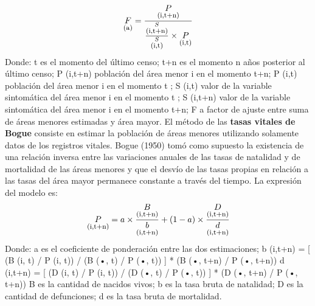 \documentclass{article}
\theoremstyle{mytheoremstyle}
\theoremstyle{mytheoremstyle}
\theoremstyle{myproblemstyle}
\begin{document}
\begin{equation}
  \underset{\textstyle \text{\footnotesize(a)}}{F}=\frac{\underset{\textstyle \text{\footnotesize(i,t+n)}}{P}}
  {\frac{\underset{\textstyle\text{\footnotesize(i,t+n)}}{S}}{\underset{\textstyle\text{\footnotesize(i,t)}}{S}}
  \times
   \underset{\textstyle \text{\footnotesize(i,t)}}{P} }
\end{equation}
\newline
Donde:\newline
t es el momento del último censo;\newline
t+n es el momento n años posterior al último censo;\newline
P (i,t+n) población del área menor i en el momento t+n;\newline
P (i,t) población del área menor i en el momento t ;\newline
S (i,t) valor de la variable sintomática del área menor i en el momento t ;\newline
S (i,t+n) valor de la variable sintomática del área menor i en el momento t+n;\newline
F a factor de ajuste entre suma de áreas menores estimadas y área mayor.\newline
\newline
El método de las \textbf{tasas vitales de Bogue} consiste en estimar la población de áreas menores
utilizando solamente datos de los registros vitales. Bogue (1950) tomó como supuesto la
existencia de una relación inversa entre las variaciones anuales de las tasas de natalidad y de
mortalidad de las áreas menores y que el desvío de las tasas propias en relación a las tasas del área
mayor permanece constante a través del tiempo. La expresión del modelo es:
\newline
\begin{equation}
  \underset{\textstyle \text{\footnotesize(i,t+n)}}{P}=a \times \frac{\underset{\textstyle \text{\footnotesize(i,t+n)}}{B}}
{\underset{\textstyle\text{\footnotesize(i,t+n)}}{b}} + (1-a)\times
\frac{\underset{\textstyle \text{\footnotesize(i,t+n)}}{D}}
{\underset{\textstyle\text{\footnotesize(i,t+n)}}{d}}
\end{equation}
\newline
Donde:\newline
a es el coeficiente de ponderación entre las dos estimaciones;\newline
b (i,t+n) = [ (B (i, t) / P (i, t)) / (B (•, t) / P (•, t)) ] * (B (•, t+n) / P (•, t+n))\newline
d (i,t+n) = [ (D (i, t) / P (i, t)) / (D (•, t) / P (•, t)) ] * (D (•, t+n) / P (•, t+n))\newline
B es la cantidad de nacidos vivos;\newline
b es la tasa bruta de natalidad;\newline
D es la cantidad de defunciones;\newline
d es la tasa bruta de mortalidad.\newline
\end{document}
